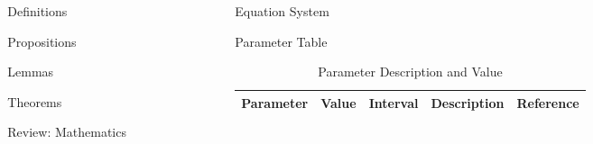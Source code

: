 \begin{frame}[t]
\begin{columns}[t]
\begin{column}{\onecolwid}
\end{column}

\begin{column}{\onecolwid} %
\begin{alertblock}{Definitions}
\end{alertblock}
\begin{alertblock}{Propositions}
\end{alertblock}
\begin{alertblock}{Lemmas}
\end{alertblock}
\begin{alertblock}{Theorems}
\end{alertblock}
\begin{alertblock}{Review: Mathematics}
\end{alertblock}
\end{column}
\begin{column}{\onecolwid} %
\begin{alertblock}{Equation System}
\end{alertblock}
\begin{alertblock}{Parameter Table}

\vspace{4pt}
\centering
\begin{table}[h]\footnotesize
	\caption{Parameter Description and Value}
	\begin{tabular}{rllp{2cm}l}
		\hline	
		Parameter & Value & Interval & Description & Reference \\
		\hline 
	\end{tabular}	
\end{table}


\end{alertblock}
\end{column}
\end{columns}
\end{frame}
